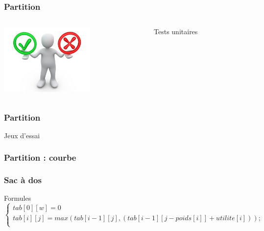 \documentclass[french]{beamer}
\begin{document}
\begin{frame}
  \frametitle{Partition}
  \begin{columns}
    \begin{column}[]{5cm}
      \begin{center}
        \includegraphics[height=3.5cm]{unitest.jpg}
      \end{center}
    \end{column}
      \begin{column}[]{5cm}
        \begin{block}{Tests unitaires}
        \end{block}
      \end{column}
    \end{columns}
  \end{frame}
  
  \begin{frame}
    \frametitle{Partition}
    \begin{block}{Jeux d'essai}
    \end{block}
  \end{frame}
  
  \begin{frame}
    \frametitle{Partition : courbe}
  \end{frame}
  
  \begin{frame}
    \frametitle{Sac à dos}
    \begin{alertblock}{Formules}
      \begin{equation}
        \begin{cases}
          tab[0][w] = 0 \\
          tab[i][j] = max(tab[i-1] [j], (tab[i-1] [j-poids[i]] + utilite[i])); \\
        \end{cases}
      \end{equation}
    \end{alertblock}
  \end{frame}
\end{document}
